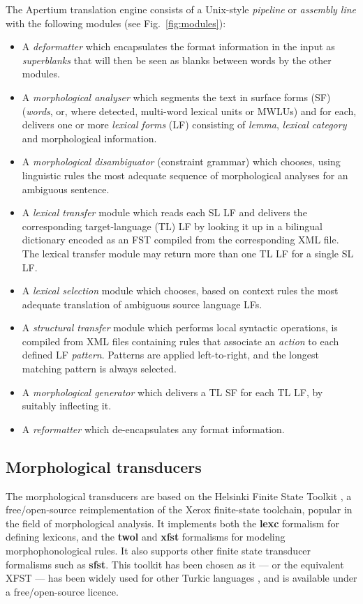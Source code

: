 \documentclass[11pt]{article}
\newenvironment{itemise}[1]{
        \begin{itemize}\setlength{\itemsep}{-0.3em}
        \vspace{-0.6em}
        #1
}{
        \end{itemize}
        \vspace{-1pt}
}
\begin{document}
The Apertium translation engine consists of a Unix-style \emph{pipeline} or
\emph{assembly line} with the following modules (see Fig.~\ref{fig:modules}):  
\begin{itemise}
\item A \emph{deformatter} which encapsulates the format information
 in the input as \emph{superblanks} that will then be seen
 as blanks between words by the other modules.
\item A \emph{morphological analyser} which segments the text in
  surface forms (SF) (\emph{words}, or, where detected, multi-word lexical
  units or MWLUs) and for each, delivers one or more \emph{lexical
    forms} (LF) consisting of \emph{lemma}, \emph{lexical category} and
  morphological information. 
\item A \emph{morphological disambiguator} (constraint grammar) which chooses, using linguistic rules
  the most adequate sequence of morphological analyses for an ambiguous sentence. 
\item A \emph{lexical transfer} module which reads each SL LF 
  and delivers the corresponding target-language (TL) LF
  by looking it up in a bilingual dictionary encoded as an FST
  compiled from the corresponding XML file. The lexical transfer module may
  return more than one TL LF for a single SL LF.
\item A \emph{lexical selection} module which chooses, based on context 
  rules the most adequate translation of ambiguous source language LFs.
\item A \emph{structural transfer} module which
    performs local syntactic operations, is compiled from XML files containing rules that 
    associate an \emph{action} to each defined LF \emph{pattern}. Patterns are applied left-to-right, and the 
    longest matching pattern is always selected.
\item A \emph{morphological generator} which delivers a TL SF
 for each TL LF, by suitably inflecting it. 
\item A \emph{reformatter} which de-encapsulates any format
  information.
\end{itemise}


\subsection{Morphological transducers}

The morphological transducers are based on the Helsinki Finite State Toolkit \citep{hfst/2011}, a free/open-source reimplementation of the Xerox finite-state toolchain, popular in the field of morphological analysis. It implements both the \textbf{lexc} formalism for defining lexicons, and the \textbf{twol} and \textbf{xfst} formalisms for modeling morphophonological rules. It also supports other finite state transducer formalisms such as \textbf{sfst}. This toolkit has been chosen as it --- or the equivalent XFST --- has been widely used for other Turkic languages \citep{coltekin2010,altintas2001,tantug2006,washingtonipasovtyers12,tyerswashingtonsalimzyanbattalov12}, and is available under a free/open-source licence.
\end{document}
